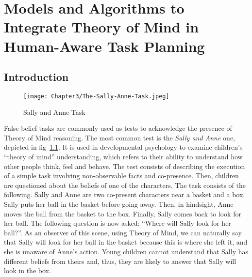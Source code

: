 \newpage
\thispagestyle{empty}
\mbox{}

\ifdefined{}
\else
\setcounter{chapter}{2} %
\dominitoc
\faketableofcontents
\fi

\chapter{Models and Algorithms to Integrate Theory of Mind in Human-Aware Task Planning}
\label{chap:3}
\minitoc


\section{Introduction}

\begin{figure}[h]
    \centering
    \texttt{[image: Chapter3/The-Sally-Anne-Task.jpeg]}
    \caption{Sally and Anne Task}
    \label{fig:sally_and_anne_task}
\end{figure}

False belief tasks are commonly used as tests to acknowledge the presence of Theory of Mind reasoning. The most common test is the \textit{Sally and Anne} one, depicted in fig~\ref{fig:sally_and_anne_task}. It is used in developmental psychology to examine children's ``theory of mind'' understanding, which refers to their ability to understand how other people think, feel and behave. The test consists of describing the execution of a simple task involving non-observable facts and co-presence. Then, children are questioned about the beliefs of one of the characters. The task consists of the following. Sally and Anne are two co-present characters near a basket and a box. Sally puts her ball in the basket before going away. Then, in hindsight, Anne moves the ball from the basket to the box. Finally, Sally comes back to look for her ball. The following question is now asked: ``Where will Sally look for her ball?''. As an observer of this scene, using Theory of Mind, we can naturally say that Sally will look for her ball in the basket because this is where she left it, and she is unaware of Anne's action. Young children cannot understand that Sally has different beliefs from theirs and, thus, they are likely to answer that Sally will look in the box. 

